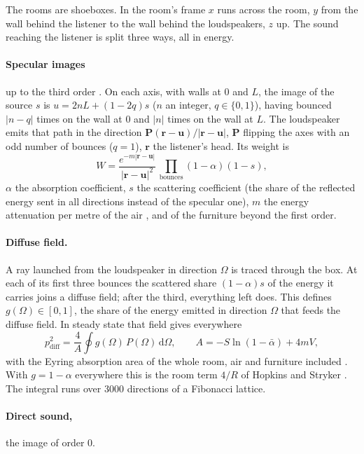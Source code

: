 \documentclass[11pt,a4paper]{article}
\newcommand{\vect}[1]{\mathbf{#1}}
\newcommand{\dd}{\,\mathrm{d}}
\begin{document}
The rooms are shoeboxes. In the room's frame $x$ runs across the room, $y$ from the wall behind the
listener to the wall behind the loudspeakers, $z$ up. The sound reaching the listener is split three
ways, all in energy.

\paragraph{Specular images} up to the third order \cite{allen1979}. On each axis, with walls at 0 and
$L$, the image of the source $s$ is $u = 2nL + (1 - 2q)s$ ($n$ an integer, $q \in \{0, 1\}$), having
bounced $|n - q|$ times on the wall at 0 and $|n|$ times on the wall at $L$. The loudspeaker emits
that path in the direction $\vect P(\vect r - \vect u)/|\vect r - \vect u|$, $\vect P$ flipping the
axes with an odd number of bounces ($q = 1$), $\vect r$ the listener's head. Its weight is
\begin{equation}
W = \frac{e^{-m |\vect r - \vect u|}}{|\vect r - \vect u|^2}\,\prod_{\text{bounces}} (1 - \alpha)(1 - s),
\end{equation}
$\alpha$ the absorption coefficient, $s$ the scattering coefficient (the share of the reflected energy
sent in all directions instead of the specular one), $m$ the energy attenuation per metre of the air
\cite{iso9613}, and of the furniture beyond the first order.

\paragraph{Diffuse field.} A ray launched from the loudspeaker in direction $\Omega$ is traced through
the box. At each of its first three bounces the scattered share $(1 - \alpha)s$ of the energy it
carries joins a diffuse field; after the third, everything left does. This defines
$g(\Omega) \in [0, 1]$, the share of the energy emitted in direction $\Omega$ that feeds the diffuse
field. In steady state that field gives everywhere
\begin{equation}
p^2_{\mathrm{diff}} = \frac{4}{A}\oint g(\Omega)\,P(\Omega)\dd\Omega, \qquad
A = -S\ln(1 - \bar\alpha) + 4 m V,
\end{equation}
with the Eyring absorption area of the whole room, air and furniture included \cite{kuttruff2016}.
With $g = 1 - \alpha$ everywhere this is the room term $4/R$ of Hopkins and Stryker
\cite{hopkins1948}. The integral runs over 3000 directions of a Fibonacci lattice.

\paragraph{Direct sound,} the image of order 0.
\end{document}
